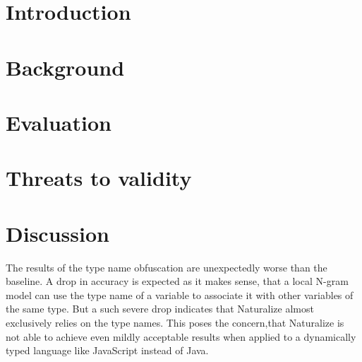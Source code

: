 \documentclass[sigconf]{acmart}
\begin{document}




\maketitle

\section{Introduction}


\section{Background}


%

\section{Evaluation}


\section{Threats to validity}

\section{Discussion}
The results of the type name obfuscation are unexpectedly worse than the baseline. A drop in accuracy is expected as it makes sense, that a local N-gram model can use the type name of a variable to associate it with other variables of the same type. But a such severe drop indicates that Naturalize almost exclusively relies on the type names. This poses the concern,that Naturalize is not able to achieve even mildly acceptable results when applied to a dynamically typed language like JavaScript instead of Java.
\end{document}
